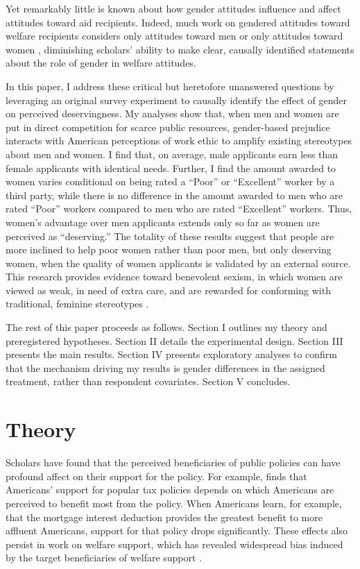 \documentclass[12pt]{article}%
\begin{document}
\begin{doublespace}
Yet remarkably little is known about how gender attitudes influence and affect attitudes toward aid recipients. Indeed, much work on gendered attitudes toward welfare recipients considers only attitudes toward men \citep{petersen2012deserves, aaroe2014crowding, willrich2000home} or only attitudes toward women \citep{monnat2010color, desante_working_2013, hayes_2020, cassese2019intersectional}, diminishing scholars' ability to make clear, causally identified statements about the role of gender in welfare attitudes. 

In this paper, I address these critical but heretofore unanswered questions by leveraging an original survey experiment to causally identify the effect of gender on perceived deservingness. My analyses show that, when men and women are put in direct competition for scarce public resources, gender-based prejudice interacts with American perceptions of work ethic to amplify existing stereotypes about men and women. I find that, on average, male applicants earn less than female applicants with identical needs. Further, I find the amount awarded to women varies conditional on being rated a ``Poor” or ``Excellent” worker by a third party, while there is no difference in the amount awarded to men who are rated ``Poor” workers compared to men who are rated ``Excellent” workers. Thus, women’s advantage over men applicants extends only so far as women are perceived as ``deserving.” The totality of these results suggest that people are more inclined to help poor women rather than poor men, but only deserving women, when the quality of women applicants is validated by an external source. This research provides evidence toward benevolent sexism, in which women are viewed as weak, in need of extra care, and are rewarded for conforming with traditional, feminine stereotypes \citep{glick_hostile_1997, glick_ambivalent_2001}.

The rest of this paper proceeds as follows. Section I outlines my theory and preregistered hypotheses. Section II details the experimental design. Section III presents the main results. Section IV presents exploratory analyses to confirm that the mechanism driving my results is gender differences in the assigned treatment, rather than respondent covariates. Section V concludes.
\\

\section*{Theory}
Scholars have found that the perceived beneficiaries of public policies can have profound affect on their support for the policy. For example, \cite{mettler2011submerged} finds that Americans’ support for popular tax policies depends on which Americans are perceived to benefit most from the policy. When Americans learn, for example, that the mortgage interest deduction provides the greatest benefit to more affluent Americans, support for that policy drops significantly. These effects also persist in work on welfare support, which has revealed widespread bias induced by the target beneficiaries of welfare support \citep{gilens_why_2000, cassese2019intersectional, winter_beyond_2006, desante_working_2013, hayes_2020}.


\end{doublespace}
\end{document}
